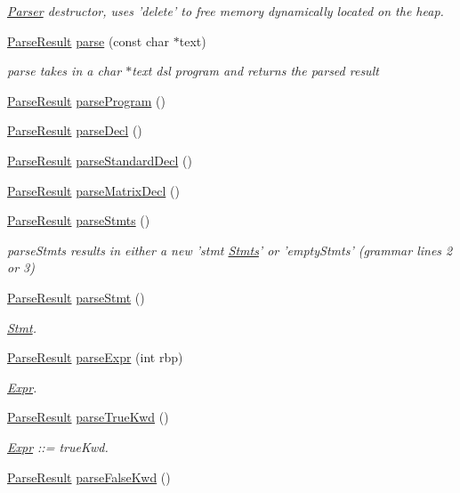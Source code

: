 \begin{DoxyCompactItemize}
\begin{DoxyCompactList}\small\item\em \hyperlink{classParser}{Parser} destructor, uses 'delete' to free memory dynamically located on the heap. \end{DoxyCompactList}\item 
\hyperlink{classParseResult}{Parse\-Result} \hyperlink{classParser_a2c1a7aa0b09a43bc1eef460817efb1d6}{parse} (const char $\ast$text)
\begin{DoxyCompactList}\small\item\em parse takes in a char $\ast$text dsl program and returns the parsed result \end{DoxyCompactList}\item 
\hyperlink{classParseResult}{Parse\-Result} \hyperlink{classParser_a14e25c84322809e2f060dc530362ea71}{parse\-Program} ()
\item 
\hyperlink{classParseResult}{Parse\-Result} \hyperlink{classParser_ac646227983887c1cd13dae67fa1bc142}{parse\-Decl} ()
\item 
\hyperlink{classParseResult}{Parse\-Result} \hyperlink{classParser_a1e1f83c0f4b11148a356d951f191425e}{parse\-Standard\-Decl} ()
\item 
\hyperlink{classParseResult}{Parse\-Result} \hyperlink{classParser_a3a00df25fda2af308b69f05eed14ac69}{parse\-Matrix\-Decl} ()
\item 
\hyperlink{classParseResult}{Parse\-Result} \hyperlink{classParser_a452db3def31683cb0305e57a01489bd4}{parse\-Stmts} ()
\begin{DoxyCompactList}\small\item\em parse\-Stmts results in either a new 'stmt \hyperlink{classStmts}{Stmts}' or 'empty\-Stmts' (grammar lines 2 or 3) \end{DoxyCompactList}\item 
\hyperlink{classParseResult}{Parse\-Result} \hyperlink{classParser_a9709c4793d0cce012d595f3ee416cd25}{parse\-Stmt} ()
\begin{DoxyCompactList}\small\item\em \hyperlink{classStmt}{Stmt}. \end{DoxyCompactList}\item 
\hyperlink{classParseResult}{Parse\-Result} \hyperlink{classParser_a50227dc24dc7a175ac0533d9957dfcf8}{parse\-Expr} (int rbp)
\begin{DoxyCompactList}\small\item\em \hyperlink{classExpr}{Expr}. \end{DoxyCompactList}\item 
\hyperlink{classParseResult}{Parse\-Result} \hyperlink{classParser_ad40f1e5e4c66814f959d982f94b767a3}{parse\-True\-Kwd} ()
\begin{DoxyCompactList}\small\item\em \hyperlink{classExpr}{Expr} \-:\-:= true\-Kwd. \end{DoxyCompactList}\item 
\hypertarget{classParser_a56f03d2e70d12648c55ce56a11e63324}{\hyperlink{classParseResult}{Parse\-Result} \hyperlink{classParser_a56f03d2e70d12648c55ce56a11e63324}{parse\-False\-Kwd} ()}\label{classParser_a56f03d2e70d12648c55ce56a11e63324}


\end{DoxyCompactItemize}
